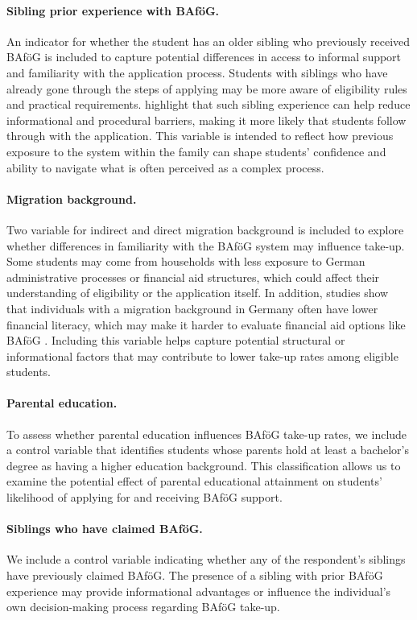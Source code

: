 \paragraph{Sibling prior experience with BAföG.} An indicator for whether the student has an older sibling who previously received BAföG is included to capture potential differences in access to informal support and familiarity with the application process. Students with siblings who have already gone through the steps of applying may be more aware of eligibility rules and practical requirements. \cite{herber_non-take-up_2019} highlight that such sibling experience can help reduce informational and procedural barriers, making it more likely that students follow through with the application. This variable is intended to reflect how previous exposure to the system within the family can shape students’ confidence and ability to navigate what is often perceived as a complex process.

\paragraph{Migration background.} Two variable for indirect and direct migration background is included to explore whether differences in familiarity with the BAföG system may influence take-up. 
Some students may come from households with less exposure to German administrative processes or financial aid structures, which could affect their understanding of eligibility or the application itself. 
In addition, studies show that individuals with a migration background in Germany often have lower financial literacy, which may make it harder to evaluate financial aid options like BAföG \citep{Tsegay_2024}. 
Including this variable helps capture potential structural or informational factors that may contribute to lower take-up rates among eligible students. 

\paragraph{Parental education.}
To assess whether parental education influences BAföG take-up rates, we include a control variable that identifies students whose parents hold at least a bachelor’s degree as having a higher education background. 
This classification allows us to examine the potential effect of parental educational attainment on students’ likelihood of applying for and receiving BAföG support.

\paragraph{Siblings who have claimed BAföG.}
We include a control variable indicating whether any of the respondent’s siblings have previously claimed BAföG. 
The presence of a sibling with prior BAföG experience may provide informational advantages or influence the individual’s own decision-making process regarding BAföG take-up.

